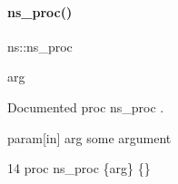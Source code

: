 \paragraph{\texorpdfstring{ns\+\_\+proc()}{ns\_proc()}}
{\footnotesize\ttfamily ns\+::ns\+\_\+proc\begin{DoxyParamCaption}\item[{}]{arg  }\end{DoxyParamCaption}}



Documented proc {\ttfamily ns\+\_\+proc} . 

param\mbox{[}in\mbox{]} arg some argument 
\begin{DoxyCode}
14   \textcolor{keyword}{proc} ns\_proc \{arg\} \{\}
\end{DoxyCode}
